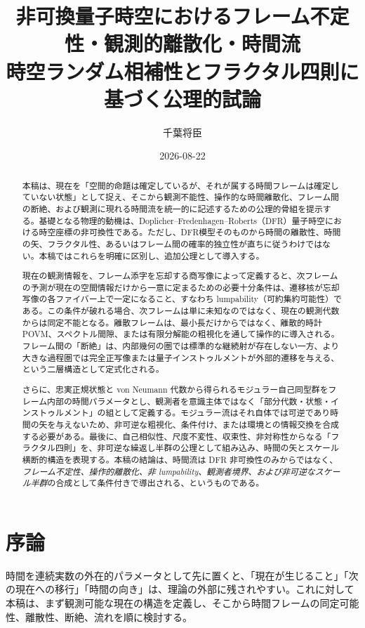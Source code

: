 \documentclass[a4paper,11pt]{ltjsarticle}
\title{非可換量子時空におけるフレーム不定性・観測的離散化・時間流\\
\large 時空ランダム相補性とフラクタル四則に基づく公理的試論}
\author{千葉将臣}
\date{2026-08-22}
\theoremstyle{remark}
\begin{document}
\maketitle

\begin{abstract}
本稿は、現在を「空間的命題は確定しているが、それが属する時間フレームは確定していない状態」として捉え、そこから観測不能性、操作的な時間離散化、フレーム間の断絶、および観測に現れる時間流を統一的に記述するための公理的骨組を提示する。基礎となる物理的動機は、Doplicher--Fredenhagen--Roberts（DFR）量子時空における時空座標の非可換性である。ただし、DFR模型そのものから時間の離散性、時間の矢、フラクタル性、あるいはフレーム間の確率的独立性が直ちに従うわけではない。本稿ではこれらを明確に区別し、追加公理として導入する。

現在の観測情報を、フレーム添字を忘却する商写像によって定義すると、次フレームの予測が現在の空間情報だけから一意に定まるための必要十分条件は、遷移核が忘却写像の各ファイバー上で一定になること、すなわち lumpability（可約集約可能性）である。この条件が破れる場合、次フレームは単に未知なのではなく、現在の観測代数からは同定不能となる。離散フレームは、最小長だけからではなく、離散的時計 POVM、スペクトル間隙、または有限分解能の粗視化を通して操作的に導入される。フレーム間の「断絶」は、内部幾何の圏では標準的な継続射が存在しない一方、より大きな過程圏では完全正写像または量子インストゥルメントが外部的遷移を与える、という二層構造として定式化される。

さらに、忠実正規状態と von Neumann 代数から得られるモジュラー自己同型群をフレーム内部の時間パラメータとし、観測者を意識主体ではなく「部分代数・状態・インストゥルメント」の組として定義する。モジュラー流はそれ自体では可逆であり時間の矢を与えないため、非可逆な粗視化、条件付け、または環境との情報交換を合成する必要がある。最後に、自己相似性、尺度不変性、収束性、非対称性からなる「フラクタル四則」を、非可逆な繰返し半群の公理として組み込み、時間の矢とスケール横断的構造を表現する。本稿の結論は、時間流は DFR 非可換性のみからではなく、\emph{フレーム不定性、操作的離散化、非 lumpability、観測者境界、および非可逆なスケール半群}の合成として条件付きで導出される、というものである。
\end{abstract}

\tableofcontents

\section{序論}

時間を連続実数の外在的パラメータとして先に置くと、「現在が生じること」「次の現在への移行」「時間の向き」は、理論の外部に残されやすい。これに対して本稿は、まず観測可能な現在の構造を定義し、そこから時間フレームの同定可能性、離散性、断絶、流れを順に検討する。
\end{document}
